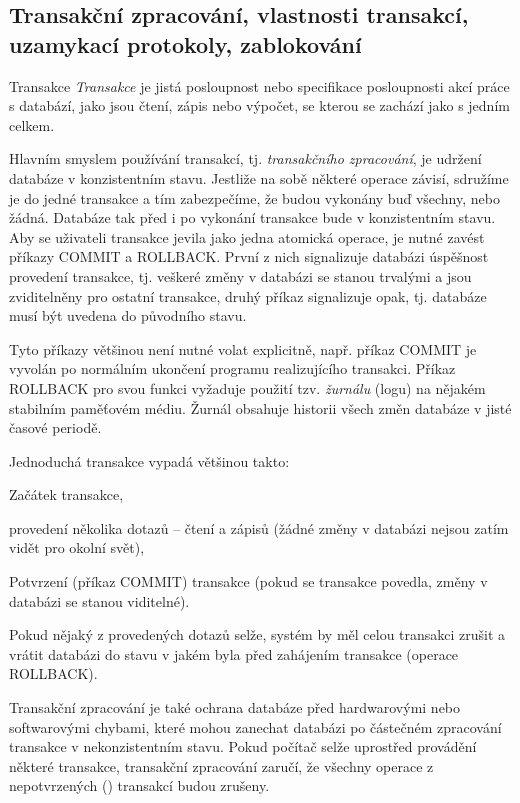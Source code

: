 \subsection{Transakční zpracování, vlastnosti transakcí, uzamykací protokoly, zablokování}

\begin{definiceN}{Transakce}
\emph{Transakce} je jistá posloupnost nebo specifikace posloupnosti akcí práce s databází, jako
jsou čtení, zápis nebo výpočet, se kterou se zachází jako s jedním celkem.
\end{definiceN}

Hlavním smyslem používání transakcí, tj. \emph{transakčního zpracování}, je
udržení databáze v konzistentním stavu. Jestliže na sobě některé operace závisí,
sdružíme je do jedné transakce a tím zabezpečíme, že budou vykonány buď
všechny, nebo žádná. Databáze tak před i po vykonání transakce bude v
konzistentním stavu. Aby se uživateli transakce jevila jako jedna atomická
operace, je nutné zavést příkazy COMMIT a ROLLBACK. První z nich signalizuje
databázi úspěšnost provedení transakce, tj. veškeré změny v databázi se stanou
trvalými a jsou zviditelněny pro ostatní transakce, druhý příkaz signalizuje
opak, tj. databáze musí být uvedena do původního stavu.

Tyto příkazy většinou není nutné volat explicitně, např. příkaz COMMIT je vyvolán po
normálním ukončení programu realizujícího transakci. Příkaz ROLLBACK pro svou
funkci vyžaduje použití tzv. \emph{žurnálu} (logu) na nějakém stabilním
paměťovém médiu. Žurnál obsahuje historii všech změn databáze v jisté časové
periodě.

Jednoduchá transakce vypadá většinou takto:
\begin{penumerate}
  \item Začátek transakce,
  \item provedení několika dotazů -- čtení a zápisů (žádné změny v databázi nejsou zatím vidět pro
  okolní svět),
  \item Potvrzení (příkaz COMMIT) transakce (pokud se transakce povedla, změny
  v databázi se stanou viditelné).
\end{penumerate}
Pokud nějaký z provedených dotazů selže, systém by měl celou transakci zrušit a
vrátit databázi do stavu v jakém byla před zahájením transakce (operace ROLLBACK).

Transakční zpracování je také ochrana databáze před hardwarovými nebo
softwarovými chybami, které mohou zanechat databázi po částečném zpracování
transakce v nekonzistentním stavu. Pokud počítač selže uprostřed provádění
některé transakce, transakční zpracování zaručí, že všechny operace z
nepotvrzených () transakcí budou zrušeny. 

